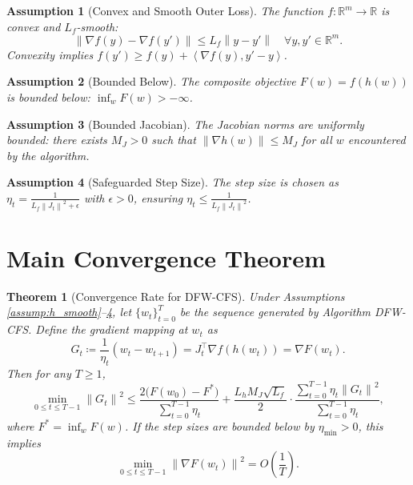 \documentclass{article}
\newcommand{\R}{\mathbb{R}}
\newcommand{\norm}[1]{\left\| #1 \right\|}
\newcommand{\inner}[2]{\left\langle #1, #2 \right\rangle}
\newtheorem{assumption}{Assumption}
\newtheorem{theorem}{Theorem}
\begin{document}
\begin{assumption}[Convex and Smooth Outer Loss] \label{assump:f_smooth}
The function $f: \R^m \to \R$ is convex and $L_f$-smooth:
\begin{equation}
    \norm{\nabla f(y) - \nabla f(y')} \le L_f \norm{y - y'} \quad \forall y, y' \in \R^m.
\end{equation}
Convexity implies $f(y') \ge f(y) + \inner{\nabla f(y)}{y' - y}$.
\end{assumption}

\begin{assumption}[Bounded Below] \label{assump:bounded}
The composite objective $F(w) = f(h(w))$ is bounded below: $\inf_w F(w) > -\infty$.
\end{assumption}

\begin{assumption}[Bounded Jacobian] \label{assump:bounded_jac}
The Jacobian norms are uniformly bounded: there exists $M_J > 0$ such that $\norm{\nabla h(w)} \le M_J$ for all $w$ encountered by the algorithm.
\end{assumption}

\begin{assumption}[Safeguarded Step Size] \label{assump:step_size}
The step size is chosen as $\eta_t = \frac{1}{L_f \norm{J_t}^2 + \epsilon}$ with $\epsilon > 0$, ensuring $\eta_t \le \frac{1}{L_f \norm{J_t}^2}$.
\end{assumption}

\section*{Main Convergence Theorem}

\begin{theorem}[Convergence Rate for DFW-CFS] \label{thm:main}
Under Assumptions \ref{assump:h_smooth}--\ref{assump:step_size}, let $\{w_t\}_{t=0}^T$ be the sequence generated by Algorithm DFW-CFS. Define the \textit{gradient mapping} at $w_t$ as
\begin{equation}
    G_t \coloneqq \frac{1}{\eta_t}(w_t - w_{t+1}) = J_t^\top \nabla f(h(w_t)) = \nabla F(w_t).
\end{equation}
Then for any $T \ge 1$,
\begin{equation}
    \min_{0 \le t \le T-1} \norm{G_t}^2 \le \frac{2\bigl(F(w_0) - F^*\bigr)}{\sum_{t=0}^{T-1} \eta_t} + \frac{L_h M_J \sqrt{L_f}}{2} \cdot \frac{\sum_{t=0}^{T-1} \eta_t \norm{G_t}^2}{\sum_{t=0}^{T-1} \eta_t},
\end{equation}
where $F^* = \inf_w F(w)$. If the step sizes are bounded below by $\eta_{\min} > 0$, this implies
\begin{equation}
    \min_{0 \le t \le T-1} \norm{\nabla F(w_t)}^2 = O\left(\frac{1}{T}\right).
\end{equation}
\end{theorem}
\end{document}

